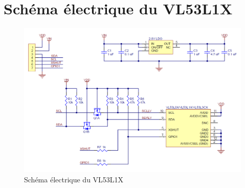 \documentclass[a4paper, 11pt]{article}
\begin{document}
\section{Schéma électrique du VL53L1X}
\begin{figure}[H]
\centering
\includegraphics[width=\textwidth]{images/VL53L1X_schematic.png}
\caption{Schéma électrique du VL53L1X}
\end{figure}
\end{document}
